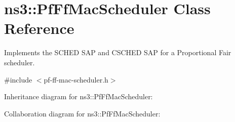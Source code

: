 \hypertarget{classns3_1_1PfFfMacScheduler}{}\section{ns3\+:\+:Pf\+Ff\+Mac\+Scheduler Class Reference}
\label{classns3_1_1PfFfMacScheduler}


Implements the S\+C\+H\+ED S\+AP and C\+S\+C\+H\+ED S\+AP for a Proportional Fair scheduler.  




{\ttfamily \#include $<$pf-\/ff-\/mac-\/scheduler.\+h$>$}



Inheritance diagram for ns3\+:\+:Pf\+Ff\+Mac\+Scheduler\+:


Collaboration diagram for ns3\+:\+:Pf\+Ff\+Mac\+Scheduler\+:
